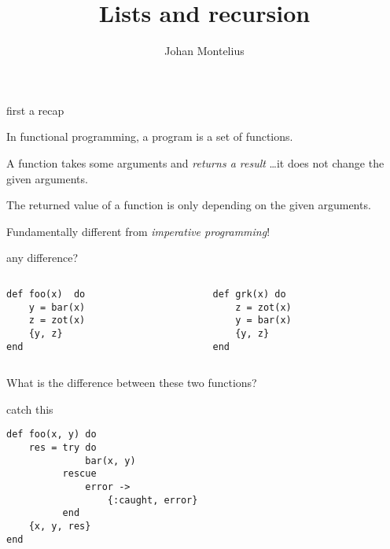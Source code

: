 

\title[ID1019 Recursion]{Lists and recursion}


\author{Johan Montelius}
\date{\semester}



\begin{frame}
\titlepage
\end{frame}

\begin{frame}{first a recap}

\pause In functional programming, a program is a set of functions.

\vspace{20pt}\pause A function takes some arguments and {\em returns a result} \ldots it does not change the given arguments.

\vspace{20pt}\pause The returned value of a function is only depending on the given arguments.

\vspace{20pt}\pause Fundamentally different from {\em imperative programming}!


\end{frame}

\begin{frame}[fragile]{any difference?}

\begin{columns}
 \begin{column}{0.5\linewidth}
\begin{verbatim} 
def foo(x)  do
    y = bar(x)
    z = zot(x)
    {y, z}
end
\end{verbatim}
 \end{column}
 \pause  
  \begin{column}{0.5\linewidth}
\begin{verbatim} 
def grk(x) do
    z = zot(x)
    y = bar(x)
    {y, z}
end
\end{verbatim}
 \end{column}
\end{columns}

\vspace{40pt} 
\pause What is the difference between these two functions?

\end{frame}

\begin{frame}[fragile]{catch this}
\begin{verbatim}
def foo(x, y) do
    res = try do
              bar(x, y)
          rescue
              error ->
                  {:caught, error}
          end
    {x, y, res}
end
\end{verbatim}
\end{frame}


